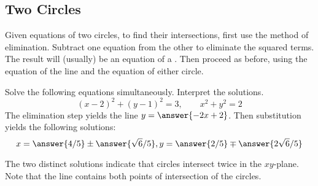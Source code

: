 \documentclass[nooutcomes]{ximera}
\begin{document}
\subsection{Two Circles}
Given equations of two circles, to find their intersections, first use the method of elimination.  Subtract one equation from the other to eliminate the squared terms.  The result will (usually) be an equation of a .  Then proceed as before, using the equation of the line and the equation of either circle.  

\begin{problem}
Solve the following equations simultaneously.  Interpret the solutions.  
\[
(x-2)^2+(y-1)^2 = 3, \qquad x^2+y^2 = 2
\]
The elimination step yields the line $y = \answer{-2x+2}$.  Then substitution yields the following solutions:  
\[
x  = \answer{4/5} \pm \answer{\sqrt{6}/5}, y = \answer{2/5} \mp \answer{2\sqrt{6}/5}
\]
\begin{hint}
The two distinct solutions indicate that circles intersect twice in the $xy$-plane.  Note that the line contains both points of intersection of the circles.  
\end{hint}
\end{problem}


%


\end{document}
